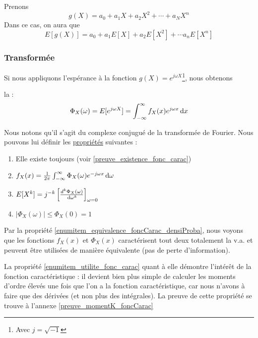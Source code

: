 \documentclass[11pt,a4paper]{article}
\numberwithin{equation}{section}
\begin{document}
\begin{exemple}
    Prenons 
     \[g(X) = a_0 + a_1X + a_2 X^2 + \cdots + a_NX^n\] Dans ce cas, on aura que \[E[g(X)] = a_0 + a_1E[X] + a_2 E[X^2] + \cdots a_n E[X^n]\]
\end{exemple}

\subsubsection{Transformée}
Si nous appliquons l'espérance à la fonction $g(X) = e^{j\omega X}$\footnote{Avec $j = \sqrt{-1}$}, nous obtenons
\begin{boite}
    la  :
    \begin{equation}
        \Phi_X(\omega) = E[e^{j\omega X}] = \int_{-\infty}^{\infty} f_X(x)e^{j\omega x} \, \mathrm d x
    \end{equation}
\end{boite}
Nous notons qu'il s'agit du complexe conjugué de la transformée de Fourier. Nous pouvons lui définir les \uline{propriétés} suivantes :
\begin{multicols}{2}
    \begin{enumerate}[label=P\arabic*.]
        \item Elle existe toujours (voir \ref{preuve_existence_fonc_carac})
        \item \label{enumitem_equivalence_foncCarac_densiProba}$f_X(x) = \frac{1}{2\pi} \int_{-\infty}^{\infty} \Phi_X(\omega) e^{-j\omega x}\, \mathrm d \omega$
        \item \label{enumitem_utilite_fonc_carac}$E[X^k] = j^{-k} \left[\frac{d^k \Phi_X(\omega)}{\, \mathrm d \omega^k}\right]_{\omega = 0}$
        \item $|\Phi_X(\omega)| \leq \Phi_X(0) = 1$
    \end{enumerate}
\end{multicols}
Par la propriété \ref{enumitem_equivalence_foncCarac_densiProba}, nous voyons que les fonctions $f_X(x)$ et $\Phi_X(x)$ caractérisent tout deux totalement la v.a. et peuvent être utilisées de manière équivalente (pas de perte d'information).

La propriété \ref{enumitem_utilite_fonc_carac} quant à elle démontre l'intérêt de la fonction caractéristique : il devient bien plus simple de calculer les moments d'ordre élevés une fois que l'on a la fonction caractéristique, car nous n'avons à faire que des dérivées (et non plus des intégrales). La preuve de cette propriété se trouve à l'annexe \ref{preuve_momentK_foncCarac}
\end{document}
